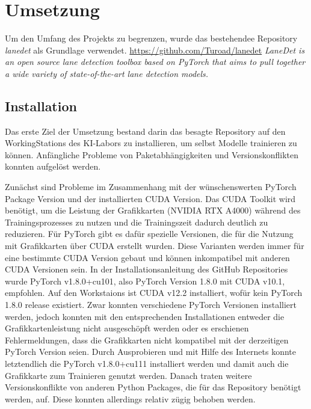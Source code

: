 \documentclass{article}
\begin{document}
    \section{Umsetzung}
        Um den Umfang des Projekts zu begrenzen, wurde das bestehendee Repository \textit{lanedet} als Grundlage verwendet.
        \url{https://github.com/Turoad/lanedet}
        \textit{LaneDet is an open source lane detection toolbox based on PyTorch that aims to pull together a wide variety of state-of-the-art lane detection models.}

        \subsection{Installation}
            Das erste Ziel der Umsetzung bestand darin das besagte Repository auf den WorkingStations des KI-Labors zu installieren, um selbst Modelle trainieren zu können.
            Anfängliche Probleme von Paketabhängigkeiten und Versionskonflikten konnten aufgelöst werden. 

            Zunächst sind Probleme im Zusammenhang mit der wünschenswerten PyTorch Package Version und der installierten CUDA Version. Das CUDA Toolkit wird benötigt, um die Leistung der Grafikkarten (NVIDIA RTX A4000) während des Trainingsprozesses zu nutzen und die Trainingszeit dadurch deutlich zu reduzieren. Für PyTorch gibt es dafür spezielle Versionen, die für die Nutzung mit Grafikkarten über CUDA erstellt wurden. Diese Varianten werden immer für eine bestimmte CUDA Version gebaut und können inkompatibel mit anderen CUDA Versionen sein. 
            In der Installationsanleitung des GitHub Repositories wurde PyTorch v1.8.0+cu101, also PyTorch Version 1.8.0 mit CUDA v10.1, empfohlen. Auf den Workstaions ist CUDA v12.2 installiert, wofür kein PyTorch 1.8.0 release existiert. Zwar konnten verschiedene PyTorch Versionen installiert werden, jedoch konnten mit den entsprechenden Installationen entweder die Grafikkartenleistung nicht ausgeschöpft werden oder es erschienen Fehlermeldungen, dass die Grafikkarten nicht kompatibel mit der derzeitigen PyTorch Version seien. 
            Durch Ausprobieren und mit Hilfe des Internets konnte letztendlich die PyTorch v1.8.0+cu111 installiert werden und damit auch die Grafikkarte zum Trainieren genutzt werden. Danach traten weitere Versionskonflikte von anderen Python Packages, die für das Repository benötigt werden, auf. Diese konnten allerdings relativ zügig behoben werden.
\end{document}
